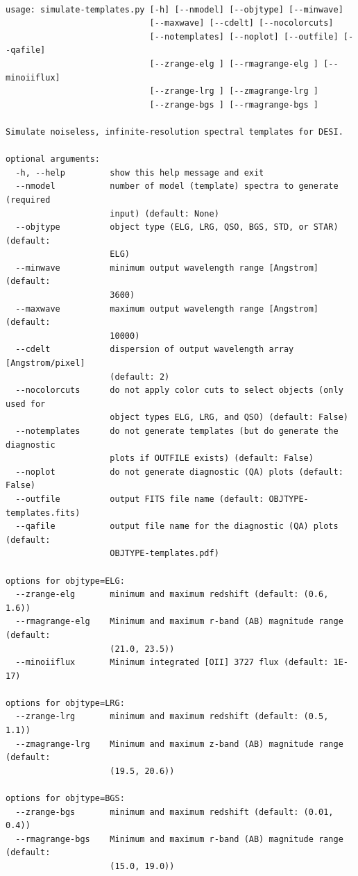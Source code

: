 \documentclass[12pt]{article}
\begin{document}
\begin{verbatim}

usage: simulate-templates.py [-h] [--nmodel] [--objtype] [--minwave]
                             [--maxwave] [--cdelt] [--nocolorcuts]
                             [--notemplates] [--noplot] [--outfile] [--qafile]
                             [--zrange-elg ] [--rmagrange-elg ] [--minoiiflux]
                             [--zrange-lrg ] [--zmagrange-lrg ]
                             [--zrange-bgs ] [--rmagrange-bgs ]

Simulate noiseless, infinite-resolution spectral templates for DESI.

optional arguments:
  -h, --help         show this help message and exit
  --nmodel           number of model (template) spectra to generate (required
                     input) (default: None)
  --objtype          object type (ELG, LRG, QSO, BGS, STD, or STAR) (default:
                     ELG)
  --minwave          minimum output wavelength range [Angstrom] (default:
                     3600)
  --maxwave          maximum output wavelength range [Angstrom] (default:
                     10000)
  --cdelt            dispersion of output wavelength array [Angstrom/pixel]
                     (default: 2)
  --nocolorcuts      do not apply color cuts to select objects (only used for
                     object types ELG, LRG, and QSO) (default: False)
  --notemplates      do not generate templates (but do generate the diagnostic
                     plots if OUTFILE exists) (default: False)
  --noplot           do not generate diagnostic (QA) plots (default: False)
  --outfile          output FITS file name (default: OBJTYPE-templates.fits)
  --qafile           output file name for the diagnostic (QA) plots (default:
                     OBJTYPE-templates.pdf)

options for objtype=ELG:
  --zrange-elg       minimum and maximum redshift (default: (0.6, 1.6))
  --rmagrange-elg    Minimum and maximum r-band (AB) magnitude range (default:
                     (21.0, 23.5))
  --minoiiflux       Minimum integrated [OII] 3727 flux (default: 1E-17)

options for objtype=LRG:
  --zrange-lrg       minimum and maximum redshift (default: (0.5, 1.1))
  --zmagrange-lrg    Minimum and maximum z-band (AB) magnitude range (default:
                     (19.5, 20.6))

options for objtype=BGS:
  --zrange-bgs       minimum and maximum redshift (default: (0.01, 0.4))
  --rmagrange-bgs    Minimum and maximum r-band (AB) magnitude range (default:
                     (15.0, 19.0))

\end{verbatim}
\end{document}
